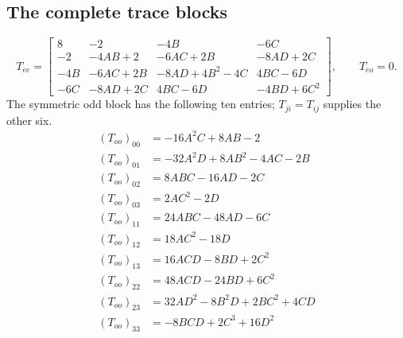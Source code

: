 \subsection{The complete trace blocks}
\begin{equation}T_{ee}=\left[\begin{matrix}8 & -2 & - 4 B & - 6 C\\-2 & - 4 A B + 2 & - 6 A C + 2 B & - 8 A D + 2 C\\- 4 B & - 6 A C + 2 B & - 8 A D + 4 B^{2} - 4 C & 4 B C - 6 D\\- 6 C & - 8 A D + 2 C & 4 B C - 6 D & - 4 B D + 6 C^{2}\end{matrix}\right],\qquad T_{eo}=0.\tag{GB16}\end{equation}
The symmetric odd block has the following ten entries; $T_{ji}=T_{ij}$ supplies the other six.
\begin{align}
(T_{oo})_{00}&=- 16 A^{2} C + 8 A B - 2\tag{GB17a}\\
(T_{oo})_{01}&=- 32 A^{2} D + 8 A B^{2} - 4 A C - 2 B\tag{GB17b}\\
(T_{oo})_{02}&=8 A B C - 16 A D - 2 C\tag{GB17c}\\
(T_{oo})_{03}&=2 A C^{2} - 2 D\tag{GB17d}\\
(T_{oo})_{11}&=24 A B C - 48 A D - 6 C\tag{GB17e}\\
(T_{oo})_{12}&=18 A C^{2} - 18 D\tag{GB17f}\\
(T_{oo})_{13}&=16 A C D - 8 B D + 2 C^{2}\tag{GB17g}\\
(T_{oo})_{22}&=48 A C D - 24 B D + 6 C^{2}\tag{GB17h}\\
(T_{oo})_{23}&=32 A D^{2} - 8 B^{2} D + 2 B C^{2} + 4 C D\tag{GB17i}\\
(T_{oo})_{33}&=- 8 B C D + 2 C^{3} + 16 D^{2}\tag{GB17j}
\end{align}
